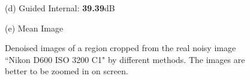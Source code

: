 \documentclass[10pt,twocolumn,letterpaper]{article}
\begin{document}
\begin{figure}
{\begin{minipage}[t]{0.195\textwidth}
{\footnotesize (d) Guided Internal: \textbf{39.39}dB }
\end{minipage}
\begin{minipage}[t]{0.195\textwidth}
\centering
{}
{\footnotesize (e) Mean Image \cite{crosschannel2016}}
\end{minipage}
}
\vspace{-2mm}
\caption{Denoised images of a region cropped from the real noisy image ``Nikon D600 ISO 3200 C1" \cite{crosschannel2016} by different methods. The 
\vspace{-0.5mm}
images are better to be zoomed in on screen.}
\vspace{-2mm}
\label{fig4}
\end{figure}
\end{document}
